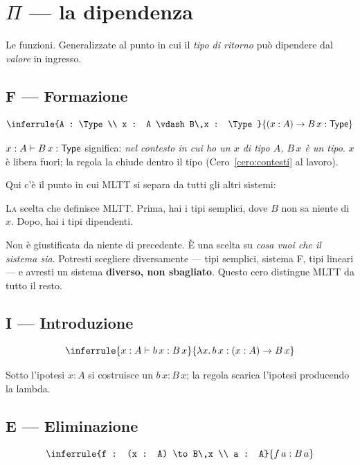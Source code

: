 \chapter{$\Pi$ --- la dipendenza}\label{cap:pi}

Le funzioni. Generalizzate al punto in cui il \emph{tipo di ritorno} pu\`o dipendere dal \emph{valore} in ingresso.

\section*{F --- Formazione}
\[
\inferrule{A : \Type \\ x : A \vdash B\,x : \Type}{(x : A) \to B\,x : \Type}
\]

$x : A \vdash B\,x : \mathsf{Type}$ significa: \emph{nel contesto in cui ho un $x$ di tipo $A$, $B\,x$ \`e un tipo}. $x$ \`e libera fuori; la regola la chiude dentro il tipo (Cero~\ref{cero:contesti} al lavoro).

Qui c'\`e il punto in cui MLTT si separa da tutti gli altri sistemi:

\begin{cero}\label{cero:dipendenza}
\textsc{La} scelta che definisce MLTT. Prima, hai i tipi semplici, dove $B$ non sa niente di $x$. Dopo, hai i tipi dipendenti.

Non \`e giustificata da niente di precedente. \`E una scelta su \emph{cosa vuoi che il sistema sia}. Potresti scegliere diversamente --- tipi semplici, sistema F, tipi lineari --- e avresti un sistema \textbf{diverso, non sbagliato}. Questo cero distingue MLTT da tutto il resto.
\end{cero}

\section*{I --- Introduzione}
\[
\inferrule{x : A \vdash b\,x : B\,x}{\lambda x.\,b\,x : (x : A) \to B\,x}
\]

Sotto l'ipotesi $x : A$ si costruisce un $b\,x : B\,x$; la regola scarica l'ipotesi producendo la lambda.

\section*{E --- Eliminazione}
\[
\inferrule{f : (x : A) \to B\,x \\ a : A}{f\,a : B\,a}
\]

